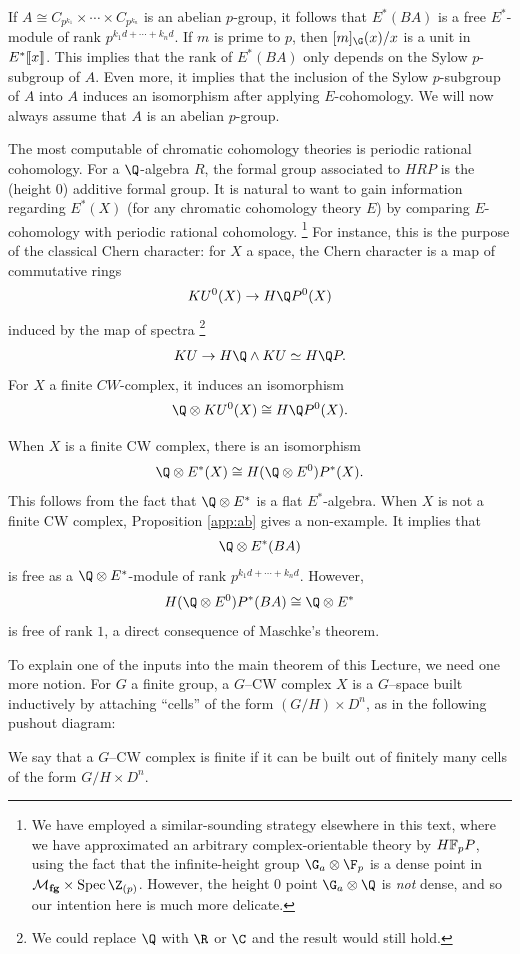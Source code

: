 If \(A \cong C_{p^{k_1}} \times \cdots \times C_{p^{k_n}}\) is an abelian \(p\)-group, it follows that \(E^*(BA)\) is a free \(E^*\)-module of rank \(p^{k_1 d + \cdots + k_n d}\).
If \(m\) is prime to \(p\), then \([m]_{\G}(x)/x\) is a unit in \(E^*\llbracket{x}\rrbracket\).
This implies that the rank of \(E^*(BA)\) only depends on the Sylow \(p\)-subgroup of \(A\).
Even more, it implies that the inclusion of the Sylow \(p\)-subgroup of \(A\) into \(A\) induces an isomorphism after applying $E$-cohomology.
We will now always assume that \(A\) is an abelian \(p\)-group.

The most computable of chromatic cohomology theories is periodic rational cohomology.
For a \(\Q\)-algebra \(R\), the formal group associated to \(HRP\) is the (height \(0\)) additive formal group.
It is natural to want to gain information regarding \(E^*(X)\) (for any chromatic cohomology theory \(E\)) by comparing \(E\)-cohomology with periodic rational cohomology.%
\footnote{%
    We have employed a similar-sounding strategy elsewhere in this text, where we have approximated an arbitrary complex-orientable theory by \(\HFp P\), using the fact that the infinite-height group \(\G_a \otimes \F_p\) is a dense point in \(\moduli{fg} \times \Spec \Z_{(p)}\).
    However, the height \(0\) point \(\G_a \otimes \Q\) is \emph{not} dense, and so our intention here is much more delicate.
}
For instance, this is the purpose of the classical Chern character: for \(X\) a space, the Chern character is a map of commutative rings
\[
KU^0(X) \to H\Q P^0(X)
\] 
induced by the map of spectra%
\footnote{%
    We could replace \(\Q\) with \(\R\) or \(\C\) and the result would still hold.
}
\[KU \to H\Q \wedge KU \simeq H\Q P.\]
For \(X\) a finite \(CW\)-complex, it induces an isomorphism
\[
\Q \otimes KU^0(X) \cong H\Q P^0(X).
\]

When \(X\) is a finite CW complex, there is an isomorphism
\begin{equation*}
\Q \otimes E^*(X) \cong H(\Q \otimes E^0)P^*(X).
\end{equation*}
This follows from the fact that \(\Q \otimes E^*\) is a flat \(E^*\)-algebra.
When \(X\) is not a finite CW complex, Proposition \ref{app:ab} gives a non-example.
It implies that
\[
\Q \otimes E^*(BA)
\]
is free as a \(\Q \otimes E^*\)-module of rank \(p^{k_1 d + \cdots + k_n d}\).
However, \[H(\Q \otimes E^0)P^*(BA) \cong \Q \otimes E^*\] is free of rank \(1\), a direct consequence of Maschke's theorem.

To explain one of the inputs into the main theorem of this Lecture, we need one more notion.
For \(G\) a finite group, a \(G\)--CW complex \(X\) is a \(G\)--space built inductively by attaching ``cells'' of the form \((G/H) \times D^n\), as in the following pushout diagram:
\begin{center}
\end{center}
We say that a \(G\)--CW complex is finite if it can be built out of finitely many cells of the form \(G/H \times D^n\).

